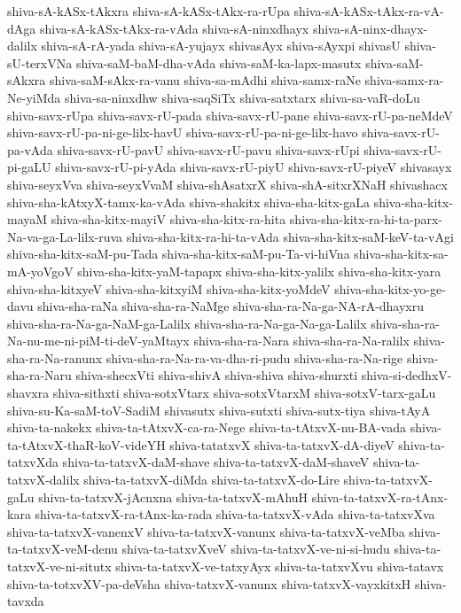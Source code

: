 {shiva-sA-kASx-tAkxra
shiva-sA-kASx-tAkx-ra-rUpa
shiva-sA-kASx-tAkx-ra-vA-dAga
shiva-sA-kASx-tAkx-ra-vAda
shiva-sA-ninxdhayx
shiva-sA-ninx-dhayx-dalilx
shiva-sA-rA-yada
shiva-sA-yujayx
shivasAyx
shiva-sAyxpi
shivasU
shiva-sU-terxVNa
shiva-saM-baM-dha-vAda
shiva-saM-ka-lapx-masutx
shiva-saM-sAkxra
shiva-saM-sAkx-ra-vanu
shiva-sa-mAdhi
shiva-samx-raNe
shiva-samx-ra-Ne-yiMda
shiva-sa-ninxdhw
shiva-saqSiTx
shiva-satxtarx
shiva-sa-vaR-doLu
shiva-savx-rUpa
shiva-savx-rU-pada
shiva-savx-rU-pane
shiva-savx-rU-pa-neMdeV
shiva-savx-rU-pa-ni-ge-lilx-havU
shiva-savx-rU-pa-ni-ge-lilx-havo
shiva-savx-rU-pa-vAda
shiva-savx-rU-pavU
shiva-savx-rU-pavu
shiva-savx-rUpi
shiva-savx-rU-pi-gaLU
shiva-savx-rU-pi-yAda
shiva-savx-rU-piyU
shiva-savx-rU-piyeV
shivasayx
shiva-seyxVva
shiva-seyxVvaM
shiva-shAsatxrX
shiva-shA-sitxrXNaH
shivashacx
shiva-sha-kAtxyX-tamx-ka-vAda
shiva-shakitx
shiva-sha-kitx-gaLa
shiva-sha-kitx-mayaM
shiva-sha-kitx-mayiV
shiva-sha-kitx-ra-hita
shiva-sha-kitx-ra-hi-ta-parx-Na-va-ga-La-lilx-ruva
shiva-sha-kitx-ra-hi-ta-vAda
shiva-sha-kitx-saM-keV-ta-vAgi
shiva-sha-kitx-saM-pu-Tada
shiva-sha-kitx-saM-pu-Ta-vi-hiVna
shiva-sha-kitx-sa-mA-yoVgoV
shiva-sha-kitx-yaM-tapapx
shiva-sha-kitx-yalilx
shiva-sha-kitx-yara
shiva-sha-kitxyeV
shiva-sha-kitxyiM
shiva-sha-kitx-yoMdeV
shiva-sha-kitx-yo-ge-davu
shiva-sha-raNa
shiva-sha-ra-NaMge
shiva-sha-ra-Na-ga-NA-rA-dhayxru
shiva-sha-ra-Na-ga-NaM-ga-Lalilx
shiva-sha-ra-Na-ga-Na-ga-Lalilx
shiva-sha-ra-Na-nu-me-ni-piM-ti-deV-yaMtayx
shiva-sha-ra-Nara
shiva-sha-ra-Na-ralilx
shiva-sha-ra-Na-ranunx
shiva-sha-ra-Na-ra-va-dha-ri-pudu
shiva-sha-ra-Na-rige
shiva-sha-ra-Naru
shiva-shecxVti
shiva-shivA
shiva-shiva
shiva-shurxti
shiva-si-dedhxV-shavxra
shiva-sithxti
shiva-sotxVtarx
shiva-sotxVtarxM
shiva-sotxV-tarx-gaLu
shiva-su-Ka-saM-toV-SadiM
shivasutx
shiva-sutxti
shiva-sutx-tiya
shiva-tAyA
shiva-ta-nakekx
shiva-ta-tAtxvX-ca-ra-Nege
shiva-ta-tAtxvX-nu-BA-vada
shiva-ta-tAtxvX-thaR-koV-videYH
shiva-tatatxvX
shiva-ta-tatxvX-dA-diyeV
shiva-ta-tatxvXda
shiva-ta-tatxvX-daM-shave
shiva-ta-tatxvX-daM-shaveV
shiva-ta-tatxvX-dalilx
shiva-ta-tatxvX-diMda
shiva-ta-tatxvX-do-Lire
shiva-ta-tatxvX-gaLu
shiva-ta-tatxvX-jAcnxna
shiva-ta-tatxvX-mAhuH
shiva-ta-tatxvX-ra-tAnx-kara
shiva-ta-tatxvX-ra-tAnx-ka-rada
shiva-ta-tatxvX-vAda
shiva-ta-tatxvXva
shiva-ta-tatxvX-vanenxV
shiva-ta-tatxvX-vanunx
shiva-ta-tatxvX-veMba
shiva-ta-tatxvX-veM-denu
shiva-ta-tatxvXveV
shiva-ta-tatxvX-ve-ni-si-hudu
shiva-ta-tatxvX-ve-ni-situtx
shiva-ta-tatxvX-ve-tatxyAyx
shiva-ta-tatxvXvu
shiva-tatavx
shiva-ta-totxvXV-pa-deVsha
shiva-tatxvX-vanunx
shiva-tatxvX-vayxkitxH
shiva-tavxda
}
